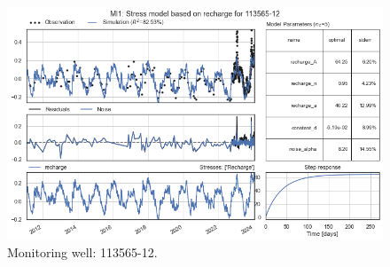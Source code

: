 \begin{figure}[htbp]
\begin{minipage}{0.32\textwidth}
        \includegraphics[width=\linewidth]{frontmatter/Rozenburg-fig/21.png}
        \caption{Monitoring well: 113565-12.}
        \label{fig:112565-3}
    \end{minipage}
\end{figure}
